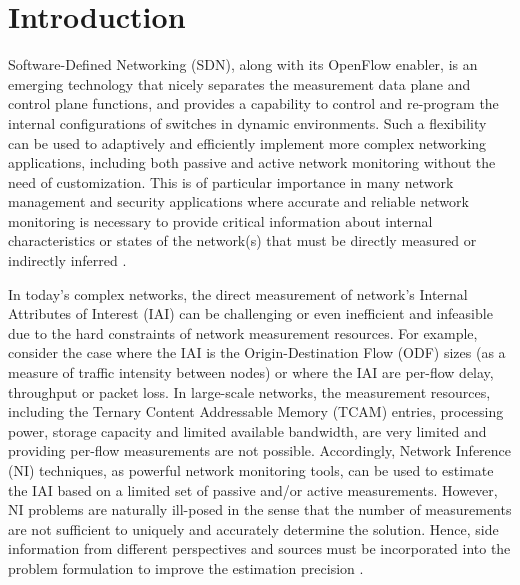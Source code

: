 \section{Introduction}  \label{sec:SNIPERIntro} 
Software-Defined Networking (SDN), along with its OpenFlow enabler, is an emerging technology that nicely separates the measurement data plane and control plane functions, and provides a capability to control and re-program the internal configurations of switches in dynamic environments. Such a flexibility can be used to adaptively and efficiently implement more complex networking applications, including both passive and active network monitoring without the need of customization. This is of particular importance in many network management and security applications where accurate and reliable network monitoring is necessary to provide critical information about internal characteristics or states of the network(s) that must be directly measured or indirectly inferred \cite{MYu:2011} \cite{MYu:2013} \cite{IF14iSTAMP:2014} \cite{Adrichen:2014}. 

In today's complex networks, the direct measurement of network's Internal Attributes of Interest (IAI) can be challenging or even inefficient and infeasible due to the hard constraints of network measurement resources. For example, consider the case where the IAI is the Origin-Destination Flow (ODF) sizes (as a measure of traffic intensity between nodes) or where the IAI are per-flow delay, throughput or packet loss. In large-scale networks, the measurement resources, including the Ternary Content Addressable Memory (TCAM) entries, processing power, storage capacity and limited available bandwidth, are very limited and providing per-flow measurements are not possible. Accordingly, Network Inference (NI) techniques, as powerful network monitoring tools, can be used to estimate the IAI based on a limited set of passive and/or active measurements. However, NI problems are naturally ill-posed in the sense that the number of measurements are not sufficient to uniquely and accurately determine the solution. Hence, side information from different perspectives and sources must be incorporated into the problem formulation to improve the estimation precision \cite{QZhao:2006} \cite{MDFE:2013} \cite{HNguyen:2007}. %

